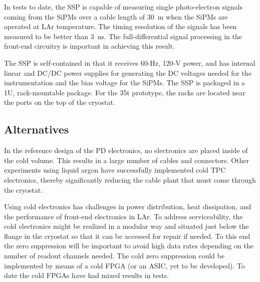 In tests to date, the SSP is capable of measuring single
photo-electron signals coming from the SiPMs over a cable length of 30~m when the SiPMs are operated at LAr temperature.  The timing
resolution of the signals has been measured to be better than 3~ns.
The full-differential signal processing in the front-end circuitry is
important in achieving this result.
 
The SSP is self-contained in that it receives 60-Hz, 120-V power, and
has internal linear and DC/DC power supplies for generating the DC
voltages needed for the instrumentation %
and the bias voltage
for the SiPMs.  The SSP is packaged in a 1U, rack-mountable
package. For the 35t prototype, the racks are located near the
ports on the top of the cryostat.

\subsection{Alternatives}
\label{sec_alt}



In the reference design of the PD electronics, %
no electronics are placed inside of the cold volume.  This results in a
large number of cables and connectors.  Other experiments using liquid
argon have successfully implemented cold TPC electronics, thereby
significantly reducing the cable plant that must come through the
cryostat.  

Using cold electronics  has challenges in power distribution, heat
dissipation, and the performance of front-end electronics in LAr. To
address serviceability, the cold electronics might be realized in a
modular way and situated just below the flange in the cryostat so that
it can be accessed for repair if needed.  To this end
the zero suppression will be important to avoid high data rates
depending on the number of readout channels needed.  %
The cold zero suppression %
could be implemented by means of a cold FPGA (or an
ASIC, yet to be developed).  To date the cold FPGAs have had mixed
results in tests. 


